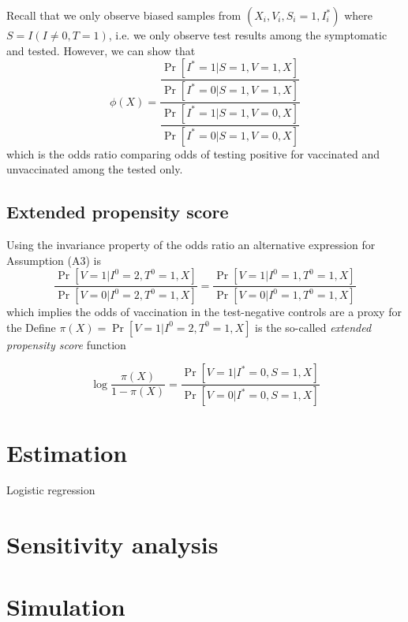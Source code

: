 \documentclass[11pt]{article}
\begin{document}
Recall that we only observe biased samples from $(X_i, V_i, S_i = 1, I^*_i)$ where $S = I(I \neq 0, T = 1)$, i.e. we only observe test results among the symptomatic and tested. However, we can show that 
    \begin{equation}
         \phi(X) = \dfrac{\dfrac{\Pr[I^* = 1 | S = 1, V = 1, X]}{\Pr[I^* = 0 | S = 1, V = 1, X]}}{\dfrac{\Pr[I^* = 1 | S = 1, V = 0, X]}{\Pr[I^* = 0 | S = 1, V = 0, X]}}
    \end{equation}    
which is the odds ratio comparing odds of testing positive for vaccinated and unvaccinated among the tested only.

\subsection{Extended propensity score}
Using the invariance property of the odds ratio an alternative expression for Assumption (A3) is
$$\frac{\Pr[V = 1 | I^0 = 2, T^0 = 1, X]}{\Pr[ V = 0 | I^0 = 2, T^0 = 1, X]} =\frac{\Pr[V = 1 | I^0 = 1, T^0 = 1, X]}{\Pr[V = 0 | I^0 = 1, T^0 = 1, X]}$$
which implies the odds of vaccination in the test-negative controls are a proxy for the Define $\pi(X) = \Pr[V = 1 | I^0 = 2, T^0 = 1, X]$ is the so-called \textit{extended propensity score} function

$$\log \dfrac{\pi(X)}{1 - \pi(X)} =  \frac{\Pr[V = 1 | I^* = 0, S = 1, X]}{\Pr[V = 0 | I^* = 0, S = 1, X]}$$
\section{Estimation}

Logistic regression 

\section{Sensitivity analysis}

\section{Simulation}
\end{document}
